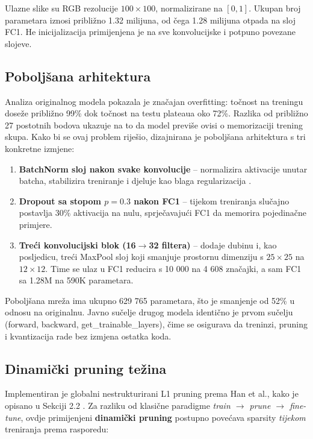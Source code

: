 \documentclass[letterpaper, 10 pt, conference]{ieeeconf}
\begin{document}
Ulazne slike su RGB rezolucije $100\times100$, normalizirane na $[0,1]$.
Ukupan broj parametara iznosi približno 1.32 milijuna, od čega 1.28 milijuna otpada na sloj FC1.
He inicijalizacija primijenjena je na sve konvolucijske i potpuno povezane slojeve.

\subsection{Poboljšana arhitektura}

Analiza originalnog modela pokazala je značajan overfitting: točnost na treningu doseže približno 99\% dok točnost na testu plateaua oko 72\%.
Razlika od približno 27 postotnih bodova ukazuje na to da model previše ovisi o memorizaciji trening skupa.
Kako bi se ovaj problem riješio, dizajnirana je poboljšana arhitektura s tri konkretne izmjene:

\begin{enumerate}
  \item \textbf{BatchNorm sloj nakon svake konvolucije} -- normalizira aktivacije unutar batcha, stabilizira treniranje i djeluje kao blaga regularizacija \cite{ioffe2015batchnorm}.
  \item \textbf{Dropout sa stopom $p=0.3$ nakon FC1} -- tijekom treniranja slučajno postavlja 30\% aktivacija na nulu, sprječavajući FC1 da memorira pojedinačne primjere.
  \item \textbf{Treći konvolucijski blok (16$\rightarrow$32 filtera)} -- dodaje dubinu i, kao posljedicu, treći MaxPool sloj koji smanjuje prostornu dimenziju s $25\times25$ na $12\times12$. Time se ulaz u FC1 reducira s 10 000 na 4 608 značajki, a sam FC1 sa 1.28M na 590K parametara.
\end{enumerate}

Poboljšana mreža ima ukupno 629 765 parametara, što je smanjenje od 52\% u odnosu na originalnu.
Javno sučelje drugog modela identično je prvom sučelju (forward, backward, get\_trainable\_layers), čime se osigurava da treninzi, pruning i kvantizacija rade bez izmjena ostatka koda.

\subsection{Dinamički pruning težina}

Implementiran je globalni nestrukturirani L1 pruning prema Han et al., kako je opisano u Sekciji 2.2 \cite{li2023survey}.
Za razliku od klasične paradigme \textit{train $\rightarrow$ prune $\rightarrow$ fine-tune}, ovdje primijenjeni \textbf{dinamički pruning} postupno povećava sparsity \textit{tijekom} treniranja prema rasporedu:
\end{document}
